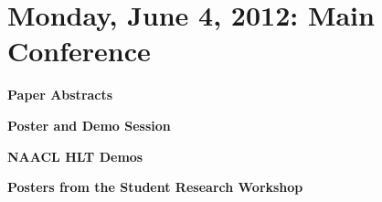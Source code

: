 \chapter{Monday, June 4, 2012: Main Conference}
\thispagestyle{emptyheader}

\newpage
\newpage
\newpage

\vspace{1em}\par\centerline{\bfseries\Large Paper Abstracts}\vspace{1em}\par
{}






\newpage

\vspace{1em}\par\centerline{\bfseries\Large Poster and Demo Session}\vspace{1em}\par
{}

\noindent
\vspace{1em}\par\centerline{\bfseries NAACL HLT Demos}\vspace{1em}\par

\noindent


\noindent
\vspace{1em}\par\centerline{\bfseries Posters from the Student Research Workshop}\vspace{1em}\par

